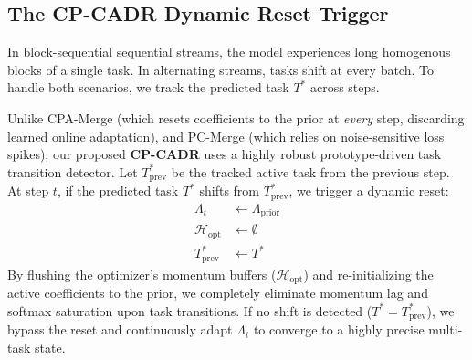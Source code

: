 \documentclass{article}
\theoremstyle{plain}
\theoremstyle{definition}
\theoremstyle{remark}
\begin{document}
\subsection{The CP-CADR Dynamic Reset Trigger}
In block-sequential sequential streams, the model experiences long homogenous blocks of a single task. In alternating streams, tasks shift at every batch. To handle both scenarios, we track the predicted task $T^*$ across steps.

Unlike CPA-Merge (which resets coefficients to the prior at \emph{every} step, discarding learned online adaptation), and PC-Merge (which relies on noise-sensitive loss spikes), our proposed \textbf{CP-CADR} uses a highly robust prototype-driven task transition detector. Let $T^*_{\text{prev}}$ be the tracked active task from the previous step. At step $t$, if the predicted task $T^*$ shifts from $T^*_{\text{prev}}$, we trigger a dynamic reset:
\begin{align}
    \Lambda_t &\leftarrow \Lambda_{\text{prior}} \\
    \mathcal{H}_{\text{opt}} &\leftarrow \emptyset \\
    T^*_{\text{prev}} &\leftarrow T^*
\end{align}
By flushing the optimizer's momentum buffers ($\mathcal{H}_{\text{opt}}$) and re-initializing the active coefficients to the prior, we completely eliminate momentum lag and softmax saturation upon task transitions. If no shift is detected ($T^* = T^*_{\text{prev}}$), we bypass the reset and continuously adapt $\Lambda_t$ to converge to a highly precise multi-task state.
\end{document}
